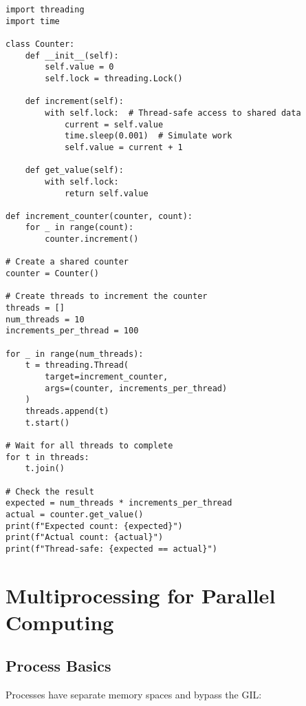 \documentclass[12pt,letterpaper]{article}
\newenvironment{macterminal}{%
    \begin{mdframed}[
        linecolor=terminalFrame,
        backgroundcolor=terminalBg,
        roundcorner=5pt,
        skipabove=10pt,
        skipbelow=10pt,
        linewidth=1pt,
        innertopmargin=10pt, %
        frametitle={%
            \tikz[baseline=(current bounding box.east), outer sep=0pt]{
                \fill[red!80!black] (0,0) circle (5pt);
                \fill[yellow!80!black] (0.7,0) circle (5pt);
                \fill[green!70!black] (1.4,0) circle (5pt);
            }
        },
        frametitlealignment=\raggedright, %
        frametitleaboveskip=8pt, %
        frametitlebelowskip=0pt, %
    ]
}{%
    \end{mdframed}%
}
\begin{document}
\begin{macterminal}
\begin{lstlisting}
import threading
import time

class Counter:
    def __init__(self):
        self.value = 0
        self.lock = threading.Lock()
        
    def increment(self):
        with self.lock:  # Thread-safe access to shared data
            current = self.value
            time.sleep(0.001)  # Simulate work
            self.value = current + 1
    
    def get_value(self):
        with self.lock:
            return self.value

def increment_counter(counter, count):
    for _ in range(count):
        counter.increment()

# Create a shared counter
counter = Counter()

# Create threads to increment the counter
threads = []
num_threads = 10
increments_per_thread = 100

for _ in range(num_threads):
    t = threading.Thread(
        target=increment_counter, 
        args=(counter, increments_per_thread)
    )
    threads.append(t)
    t.start()

# Wait for all threads to complete
for t in threads:
    t.join()

# Check the result
expected = num_threads * increments_per_thread
actual = counter.get_value()
print(f"Expected count: {expected}")
print(f"Actual count: {actual}")
print(f"Thread-safe: {expected == actual}")
\end{lstlisting}
\end{macterminal}

\section{Multiprocessing for Parallel Computing}

\subsection{Process Basics}

Processes have separate memory spaces and bypass the GIL:
\end{document}
